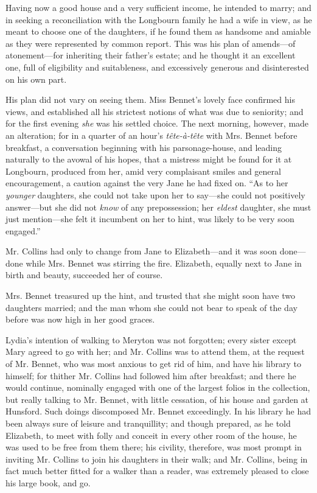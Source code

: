 Having now a good house and a very sufficient income, he intended to marry; and in seeking a reconciliation with the Longbourn family he had a wife in view, as he meant to choose one of the daughters, if he found them as handsome and amiable as they were represented by common report. This was his plan of amends---of atonement---for inheriting their father's estate; and he thought it an excellent one, full of eligibility and suitableness, and excessively generous and disinterested on his own part.

His plan did not vary on seeing them. Miss Bennet's lovely face confirmed his views, and established all his strictest notions of what was due to seniority; and for the first evening {\em she} was his settled choice. The next morning, however, made an alteration; for in a quarter of an hour's {\em tête-à-tête} with Mrs. Bennet before breakfast, a conversation beginning with his parsonage-house, and leading naturally to the avowal of his hopes, that a mistress might be found for it at Longbourn, produced from her, amid very complaisant smiles and general encouragement, a caution against the very Jane he had fixed on. “As to her {\em younger} daughters, she could not take upon her to say---she could not positively answer---but she did not {\em know} of any prepossession; her {\em eldest} daughter, she must just mention---she felt it incumbent on her to hint, was likely to be very soon engaged.”

Mr. Collins had only to change from Jane to Elizabeth---and it was soon done---done while Mrs. Bennet was stirring the fire. Elizabeth, equally next to Jane in birth and beauty, succeeded her of course.

Mrs. Bennet treasured up the hint, and trusted that she might soon have two daughters married; and the man whom she could not bear to speak of the day before was now high in her good graces.

Lydia's intention of walking to Meryton was not forgotten; every sister except Mary agreed to go with her; and Mr. Collins was to attend them, at the request of Mr. Bennet, who was most anxious to get rid of him, and have his library to himself; for thither Mr. Collins had followed him after breakfast; and there he would continue, nominally engaged with one of the largest folios in the collection, but really talking to Mr. Bennet, with little cessation, of his house and garden at Hunsford. Such doings discomposed Mr. Bennet exceedingly. In his library he had been always sure of leisure and tranquillity; and though prepared, as he told Elizabeth, to meet with folly and conceit in every other room of the house, he was used to be free from them there; his civility, therefore, was most prompt in inviting Mr. Collins to join his daughters in their walk; and Mr. Collins, being in fact much better fitted for a walker than a reader, was extremely pleased to close his large book, and go.

